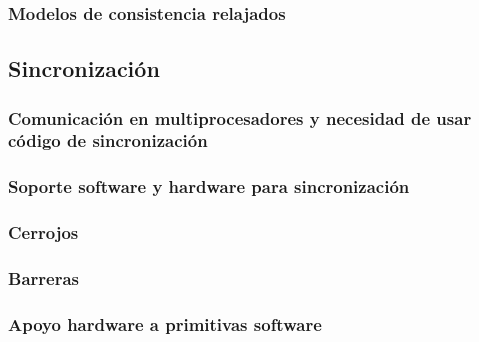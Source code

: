 \documentclass[12pt,spanish]{article}
\begin{document}
\subsubsection{Modelos de consistencia relajados}







\subsection{Sincronización}


\subsubsection{Comunicación en multiprocesadores y necesidad de usar código de sincronización}



\subsubsection{Soporte software y hardware para sincronización}



\subsubsection{Cerrojos}



\subsubsection{Barreras}



\subsubsection{Apoyo hardware a primitivas software}
\end{document}

